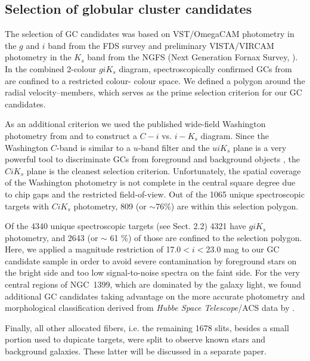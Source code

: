 \documentclass[useAMS,usenatbib]{mn2e}
\begin{document}
\subsection{Selection of globular cluster candidates}
\label{sec:selectionGC}
The selection of GC candidates was based on VST/OmegaCAM photometry in the $g$ and $i$ band from the FDS survey 
\citep{DAbrusco16,Iodice16} and preliminary VISTA/VIRCAM photometry in the $K_s$ band from the NGFS (Next 
Generation Fornax Survey, \citealt{Munoz14}). 
In the combined 2-colour $giK_s$ diagram, spectroscopically confirmed GCs from \citet{Schuberth} are confined to a restricted colour-
colour space. %
We defined a polygon around the radial velocity--members, which serves as the prime selection criterion for our GC candidates. 

As an additional criterion we used the published wide-field Washington photometry from \citet{Dirsch04} and \citet{Bassino} to construct a $C-i$ vs. $i-K_s$ diagram. Since the Washington $C$-band is similar to a $u$-band filter and the $uiK_s$ plane is a very powerful tool to discriminate GCs from foreground and background objects \citep{Munoz14}, the $CiK_s$ plane is the cleanest selection criterion. Unfortunately, the spatial coverage of the Washington photometry is not complete in the central square degree due to chip gaps and the restricted field-of-view. Out of the 1065 unique spectroscopic targets with $CiK_s$ photometry, 809 (or $\sim$76\%) are within this selection polygon.

Of the 4340 unique spectroscopic targets (see Sect. 2.2) 4321 have $giK_s$ photometry, and 2643 (or $\sim$ 61 \%) of those are confined to the selection polygon. 
Here, we applied a magnitude restriction of 17.0$<i<$23.0 mag to our GC candidate sample in order to avoid severe contamination by foreground stars on the bright side and too low signal-to-noise spectra on the faint side. 
For the very central regions of NGC~1399, which are dominated by the galaxy light, we found additional GC candidates taking advantage on the more accurate photometry and morphological classification derived from {\it Hubbe Space Telescope}/ACS data by \citet{Puzia14}.

Finally, all other allocated fibers, i.e. the remaining 1678 slits, besides a small portion used to dupicate targets, were split to observe known stars and background galaxies. These latter will be discussed in a separate paper. 
\end{document}
